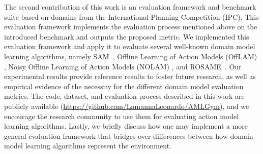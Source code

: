 \documentclass[letterpaper]{article} %
\newcommand{\sam}{\ac{SAM}\xspace}
\newif\ifaddcomments
\newcommand{\roni}[1]{\ifaddcomments{\textcolor{red}{[Roni: #1]}}\fi}
\newcommand{\leo}[1]{\ifaddcomments{\textcolor{pink}{[Leonardo: #1]}}\fi}
\begin{document}
%
The second contribution of this work is an evaluation framework and benchmark suite based on domains from the International Planning Competition (IPC). 
This evaluation framework implements the evaluation process mentioned above on the introduced benchmark and outputs the proposed metric. %
We implemented this evaluation framework and apply it to evaluate several well-known domain model learning algorithms, namely \sam~\cite{juba2021safe}, Offline Learning of Action Models (OffLAM) \citep{LAMANNA2025104256}, Noisy Offline Learning of Action Models (NOLAM) \citep{Lamanna24}, and ROSAME~\cite{xi2024neuro}. 
Our experimental results provide reference results to foster future research, as well as  empirical evidence of the necessity for the different domain model evaluation metrics. 
The code, dataset, and evaluation process described in this work are publicly available (\roni{@Leo can you add a link to the code}\url{https://github.com/LamannaLeonardo/AMLGym}), 
and we encourage the research community to use them for evaluating action model learning algorithms. 
Lastly, we briefly discuss how one may implement a more general evaluation framework that bridges over differences between how domain model learning algorithms represent the environment. 
\end{document}
